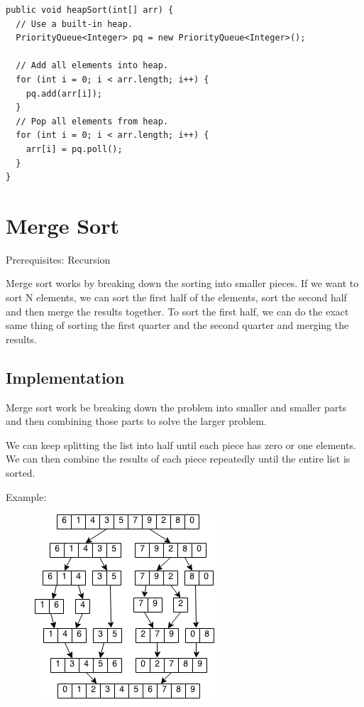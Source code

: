 \documentclass[11pt,oneside]{book}
\makeatletter
\def\maxwidth#1{\ifdim\Gin@nat@width>#1 #1\else\Gin@nat@width\fi}
\makeatother
\begin{document}
\begin{lstlisting}
public void heapSort(int[] arr) {
  // Use a built-in heap.
  PriorityQueue<Integer> pq = new PriorityQueue<Integer>();

  // Add all elements into heap.
  for (int i = 0; i < arr.length; i++) {
    pq.add(arr[i]);
  }
  // Pop all elements from heap.
  for (int i = 0; i < arr.length; i++) {
    arr[i] = pq.poll();
  }
}
\end{lstlisting}

        \section{ Merge Sort }
        

Prerequisites: Recursion

Merge sort works by breaking down the sorting into smaller pieces. If we want to sort N elements, we can sort the first half of the elements, sort the second half and then merge the results together. To sort the first half, we can do the exact same thing of sorting the first quarter and the second quarter and merging the results.

\subsection{Implementation}

Merge sort work be breaking down the problem into smaller and smaller parts and then combining those parts to solve the larger problem.

We can keep splitting the list into half until each piece has zero or one elements. We can then combine the results of each piece repeatedly until the entire list is sorted.

Example:

\vspace{5px}\begin{figure}[H]\centering
        \includegraphics[width=0.66\maxwidth{\textwidth}]{mergesort.png}
        \end{figure}
\end{document}

